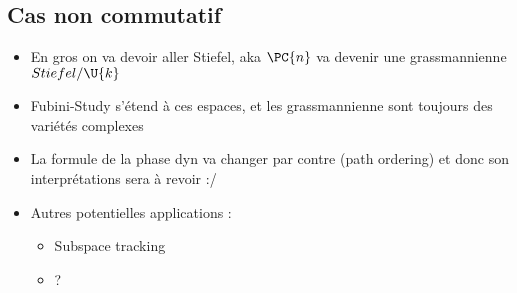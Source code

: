 \subsection{\todo Cas non commutatif}\label{subsec:non-commu}

\begin{itemize}
	
	\item En gros on va devoir aller Stiefel, aka $\PC{n}$ va devenir une grassmannienne $Stiefel/\U{k}$
	
	\item Fubini-Study s'étend à ces espaces, et les grassmannienne sont toujours des variétés complexes
	
	\item La formule de la phase dyn va changer par contre (path ordering) et donc son interprétations sera à revoir :/
	
	\item Autres potentielles applications :
	\begin{itemize}
		
		\item Subspace tracking
		
		\item ?
	\end{itemize}
	
\end{itemize}


